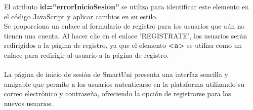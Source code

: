 \documentclass[12pt]{report}
\begin{document}
El atributo \textbf{id=''errorInicioSesion''} se utiliza para identificar este elemento en el código JavaScript y aplicar cambios en su estilo.\\
Se proporciona un enlace al formulario de registro para los usuarios que aún no tienen una cuenta. Al hacer clic en el enlace 'REGISTRATE', los usuarios serán redirigidos a la página de registro, ya que el elemento \textbf{\textless a\textgreater} se utiliza como un enlace para redirigir al usuario a la página de registro.
\\\\
La página de inicio de sesión de SmartUni presenta una interfaz sencilla y amigable que permite a los usuarios autenticarse en la plataforma utilizando su correo electrónico y contraseña, ofreciendo la opción de registrarse para los nuevos usuarios.
\end{document}
